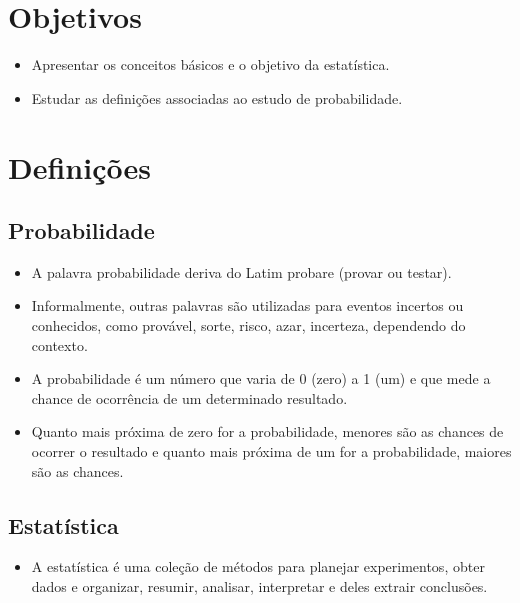 \documentclass[
]{book}
\providecommand{\tightlist}{%
  \setlength{\itemsep}{0pt}\setlength{\parskip}{0pt}}
\begin{document}
\hypertarget{objetivos-1}{%
\section{Objetivos}\label{objetivos-1}}

\begin{itemize}
\item
  Apresentar os conceitos básicos e o objetivo da estatística.
\item
  Estudar as definições associadas ao estudo de probabilidade.
\end{itemize}

\hypertarget{definiuxe7uxf5es}{%
\section{Definições}\label{definiuxe7uxf5es}}

\hypertarget{probabilidade}{%
\subsection{Probabilidade}\label{probabilidade}}

\begin{itemize}
\item
  A palavra probabilidade deriva do Latim probare (provar ou testar).
\item
  Informalmente, outras palavras são utilizadas para eventos incertos ou conhecidos, como provável, sorte, risco, azar, incerteza, dependendo do contexto.
\item
  A probabilidade é um número que varia de 0 (zero) a 1 (um) e que mede a chance de ocorrência de um determinado resultado.
\item
  Quanto mais próxima de zero for a probabilidade, menores são as chances de ocorrer o resultado e quanto mais próxima de um for a probabilidade, maiores são as chances.
\end{itemize}

\hypertarget{estatuxedstica-1}{%
\subsection{Estatística}\label{estatuxedstica-1}}

\begin{itemize}
\tightlist
\item
  A estatística é uma coleção de métodos para planejar experimentos, obter dados e organizar, resumir, analisar, interpretar e deles extrair conclusões.
\end{itemize}
\end{document}
